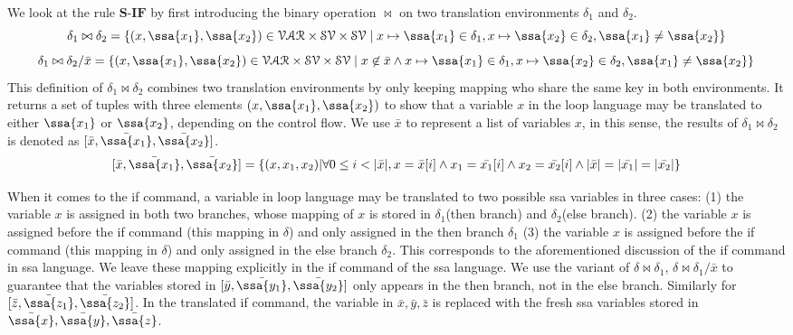 We look at the rule $\textbf{S-IF}$ by first introducing the binary operation $\bowtie$ on two translation environments $\delta_1$ and $\delta_2$. 
\[ \delta_1 \bowtie \delta_2 = \{ ( x, {\ssa{x_1}, \ssa{x_2}} ) \in \mathcal{VAR} \times \mathcal{SV} \times \mathcal{SV} \mid x \mapsto {\ssa{x_1}} \in \delta_1 , x \mapsto {\ssa{x_2} } \in \delta_2, {\ssa{x_1} \not= {\ssa{x_2} }  }  \} \]
\[ \delta_1 \bowtie \delta_2 / \bar{x} = \{ ( x, {\ssa{x_1}, \ssa{x_2}} ) \in \mathcal{VAR} \times \mathcal{SV} \times \mathcal{SV} \mid x \not\in \bar{x} \land x \mapsto {\ssa{x_1}} \in \delta_1 , x \mapsto {\ssa{x_2} } \in \delta_2, {\ssa{x_1} \not= {\ssa{x_2} }   }  \} \]
This definition of $\delta_1 \bowtie \delta_2$ combines two translation environments by only keeping mapping who share the same key in both environments. It returns a set of tuples with three elements $(x,\ssa{x_1}, \ssa{x_2})$ to show that a variable $x$ in the loop language may be translated to either $\ssa{x_1}$ or $\ssa{x_2}$, depending on the control flow. We use $\bar{x}$ to represent a list of variables $x$, in this sense, the results of  $\delta_1 \bowtie \delta_2$ is denoted as $ [\bar{x}, \bar{\ssa{x_1}}, \bar{\ssa{x_2}}]$.
\[
 [\bar{x}, \bar{\ssa{x_1}}, \bar{\ssa{x_2}}] = \{ (x, x_1,x_2)  | \forall 0 \leq i < |\bar{x}|, x = \bar{x }[i] \land x_1 = \bar{x_1}[i] \land x_2 = \bar{x_2 }[i] \land |\bar{x}| = |\bar{x_1}| = |\bar{x_2}|   \}
\]

When it comes to the if command, a variable in loop language may be translated to two possible ssa variables in three cases: (1) the variable $x$ is assigned in both two branches, whose mapping of $x$ is stored in $\delta_1$(then branch) and $\delta_2$(else branch). (2) the variable $x$ is assigned before the if command (this mapping in $\delta$) and only assigned in the then branch $\delta_1$ (3) the variable $x$ is assigned before the if command (this mapping in $\delta$) and only assigned in the else branch $\delta_2$. This corresponds to the aforementioned discussion of the if command in ssa language. We leave these mapping explicitly in the if command of the ssa language. We use the variant of $\delta \bowtie \delta_1$, $\delta \bowtie \delta_1 / \bar{x}$ to guarantee that the variables stored in $ [\bar{y}, \bar{\ssa{y_1}}, \bar{\ssa{y_2}}]$ only appears in the then branch, not in the else branch. Similarly for $ [\bar{z}, \bar{\ssa{z_1}}, \bar{\ssa{z_2}}]$. In the translated if command, the variable in $\bar{x}, \bar{y}, \bar{z}$ is replaced with the fresh ssa variables stored in $\bar{\ssa{x}},\bar{\ssa{y}},\bar{\ssa{z}}$.    

